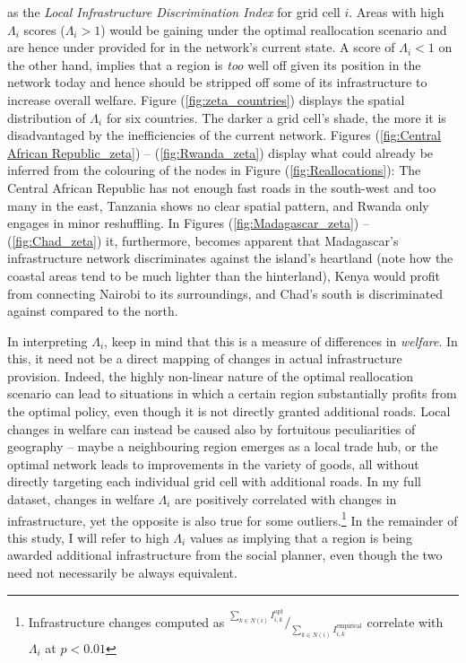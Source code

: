 \documentclass[11pt, oneside]{article}   	%
\let\oldref\ref
\renewcommand{\ref}[1]{(\oldref{#1})}
\begin{document}
as the \emph{Local Infrastructure Discrimination Index} for grid cell $i$. Areas with high $\Lambda_{i}$ scores ($\Lambda_{i} > 1$) would be gaining under the optimal reallocation scenario and are hence under provided for in the network's current state. A score of $\Lambda_{i} < 1$ on the other hand, implies that a region is \emph{too} well off given its position in the network today and hence should be stripped off some of its infrastructure to increase overall welfare. Figure \ref{fig:zeta_countries} displays the spatial distribution of $\Lambda_{i}$ for six countries. The darker a grid cell's shade, the more it is disadvantaged by the inefficiencies of the current network. Figures \ref{fig:Central African Republic_zeta} -- \ref{fig:Rwanda_zeta} display what could already be inferred from the colouring of the nodes in Figure \ref{fig:Reallocations}: The Central African Republic has not enough fast roads in the south-west and too many in the east, Tanzania shows no clear spatial pattern, and Rwanda only engages in minor reshuffling. In Figures \ref{fig:Madagascar_zeta} -- \ref{fig:Chad_zeta} it, furthermore, becomes apparent that Madagascar's infrastructure network discriminates against the island's heartland (note how the coastal areas tend to be much lighter than the hinterland), Kenya would profit from connecting Nairobi to its surroundings, and Chad's south is discriminated against compared to the north.

In interpreting $\Lambda_{i}$, keep in mind that this is a measure of differences in \emph{welfare}. In this, it need not be a direct mapping of changes in actual infrastructure provision. Indeed, the highly non-linear nature of the optimal reallocation scenario can lead to situations in which a certain region substantially profits from the optimal policy, even though it is not directly granted additional roads. Local changes in welfare can instead be caused also by fortuitous peculiarities of geography -- maybe a neighbouring region emerges as a local trade hub, or the optimal network leads to improvements in the variety of goods, all without directly targeting each individual grid cell with additional roads. In my full dataset, changes in welfare $\Lambda_{i}$ are positively correlated with changes in infrastructure, yet the opposite is also true for some outliers.\footnote{Infrastructure changes computed as $^{\sum_{k \in N(i)}^{}I_{i,k}^{\textrm{opt}}} / _{\sum_{k \in N(i)}^{}I_{i,k}^{\textrm{empirical}}}$ correlate with $\Lambda_{i}$ at $p < 0.01$} In the remainder of this study, I will refer to high $\Lambda_{i}$ values as implying that a region is being awarded additional infrastructure from the social planner, even though the two need not necessarily be always equivalent.
\end{document}
